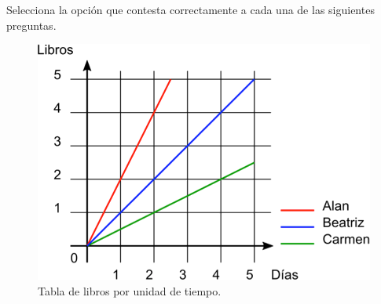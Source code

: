 Selecciona la opci\'on que contesta correctamente a cada una de las siguientes preguntas.


\begin{multicols}{2}
    \begin{figure}[H]
        \centering
        \includegraphics[width=0.85\linewidth]{../images/SINMAT1_U3_AC74_IMG1}
        \caption{Tabla de libros por unidad de tiempo.}
        \label{fig:SINMAT1_U3_AC74_IMG1}
    \end{figure}

    \begin{parts}
        
        
        
        \columnbreak
        
        
        
        
    \end{parts}
\end{multicols}

